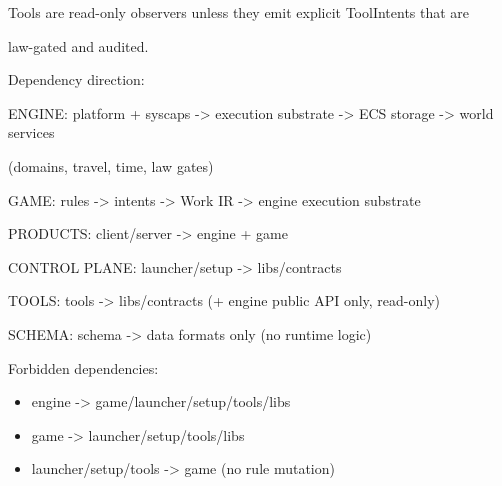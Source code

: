 \documentclass[9pt,a4paper,openany]{book}
\begin{document}
Tools are read-\allowbreak{}only observers unless they emit explicit ToolIntents that are



law-\allowbreak{}gated and audited.\allowbreak{}






Dependency direction:



ENGINE: platform + syscaps -\allowbreak{}> execution substrate -\allowbreak{}> ECS storage -\allowbreak{}> world services



(domains, travel, time, law gates)



GAME: rules -\allowbreak{}> intents -\allowbreak{}> Work IR -\allowbreak{}> engine execution substrate



PRODUCTS: client/\allowbreak{}server -\allowbreak{}> engine + game



CONTROL PLANE: launcher/\allowbreak{}setup -\allowbreak{}> libs/\allowbreak{}contracts



TOOLS: tools -\allowbreak{}> libs/\allowbreak{}contracts (+ engine public API only, read-\allowbreak{}only)



SCHEMA: schema -\allowbreak{}> data formats only (no runtime logic)






Forbidden dependencies:



\begin{itemize}
\item engine -\allowbreak{}> game/\allowbreak{}launcher/\allowbreak{}setup/\allowbreak{}tools/\allowbreak{}libs
\end{itemize}


\begin{itemize}
\item game -\allowbreak{}> launcher/\allowbreak{}setup/\allowbreak{}tools/\allowbreak{}libs
\end{itemize}


\begin{itemize}
\item launcher/\allowbreak{}setup/\allowbreak{}tools -\allowbreak{}> game (no rule mutation)
\end{itemize}
\end{document}

